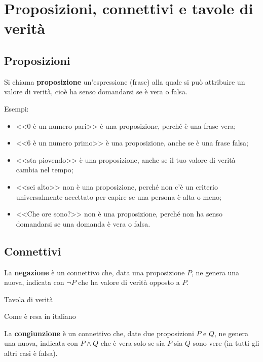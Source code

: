 \chapter{Proposizioni, connettivi e tavole di verità}
\label{ch:aritmetica_modulare}

\section{Proposizioni}
\label{sec:proposizioni}

\begin{definizione}[Proposizione]
    Si chiama \textbf{proposizione} un'espressione (frase) alla quale si può attribuire un valore di verità, cioè
    ha senso domandarsi se è vera o falsa.
\end{definizione}

Esempi:
\begin{itemize}
    \item <<0 è un numero pari>> è una proposizione, perché è una frase vera;
    \item <<6 è un numero primo>> è una proposizione, anche se è una frase falsa;
    \item <<sta piovendo>> è una proposizione, anche se il tuo valore di verità cambia nel tempo;
    \item <<sei alto>> non è una proposizione, perché non c'è un criterio universalmente accettato per capire se una
        persona è alta o meno;
    \item <<Che ore sono?>> non è una proposizione, perché non ha senso domandarsi se una domanda è vera o falsa.
\end{itemize}

\section{Connettivi}
\label{sec:connettivi}

\begin{definizione}[Negazione]
    La \textbf{negazione} è un connettivo che, data una proposizione $P$, ne genera una nuova, indicata con $\neg P$
    che ha valore di verità opposto a $P$.
\end{definizione}

Tavola di verità

Come è resa in italiano

\begin{definizione}[Congiunzione]
    La \textbf{congiunzione} è un connettivo che, date due proposizioni $P$ e $Q$, ne genera una nuova, indicata con
    $P \land Q$ che è vera solo se sia $P$ sia $Q$ sono vere (in tutti gli altri casi è falsa).
\end{definizione}

